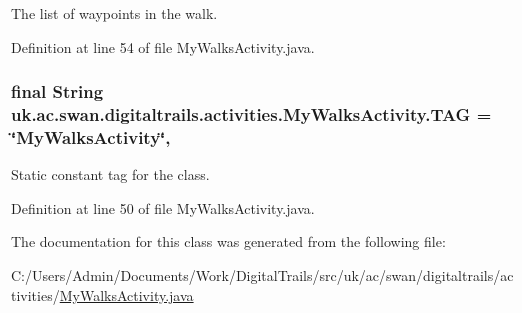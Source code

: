The list of waypoints in the walk. 



Definition at line 54 of file My\+Walks\+Activity.\+java.

\hypertarget{classuk_1_1ac_1_1swan_1_1digitaltrails_1_1activities_1_1_my_walks_activity_a63ea670d898cba74fc44732325d9a738}{
\subsubsection[{T\+A\+G}]{\setlength{\rightskip}{0pt plus 5cm}final String uk.\+ac.\+swan.\+digitaltrails.\+activities.\+My\+Walks\+Activity.\+T\+A\+G = \char`\"{}My\+Walks\+Activity\char`\"{}\hspace{0.3cm}{\ttfamily [static]}, {\ttfamily [private]}}}\label{classuk_1_1ac_1_1swan_1_1digitaltrails_1_1activities_1_1_my_walks_activity_a63ea670d898cba74fc44732325d9a738}


Static constant tag for the class. 



Definition at line 50 of file My\+Walks\+Activity.\+java.



The documentation for this class was generated from the following file\+:\begin{DoxyCompactItemize}
\item 
C\+:/\+Users/\+Admin/\+Documents/\+Work/\+Digital\+Trails/src/uk/ac/swan/digitaltrails/activities/\hyperlink{_my_walks_activity_8java}{My\+Walks\+Activity.\+java}\end{DoxyCompactItemize}
